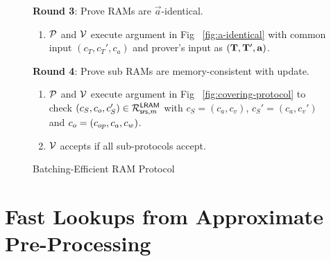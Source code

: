 \begin{figure}[t!]
\begin{mdframed}
        {\bf Round 3}: Prove RAMs are $\vec{a}$-identical.
        \begin{enumerate}[leftmargin=1em, label=\arabic*.]
            \item $\mathcal{P}$ and $\mathcal{V}$ execute argument in Fig ~\ref{fig:a-identical} with common input
            $(c_T,c_T',c_a)$ and prover's input as $(\mathbf{T},\mathbf{T}',\mathbf{a})$.
        \end{enumerate}

        {\bf Round 4}: Prove sub RAMs are memory-consistent with update.
        \begin{enumerate}[leftmargin=1em, label=\arabic*.]
        \item $\mathcal{P}$ and $\mathcal{V}$ execute argument in Fig ~\ref{fig:covering-protocol}
        to check $(c_S, c_o, c_S')\in \mathcal{R}^{\mathsf{LRAM}}_{\mathsf{srs},m}$ with $c_S = (c_a, c_v)$, $c_S'=(c_a, c_v')$ and
        $c_o=(c_{op},c_a,c_w)$.
        \item $\mathcal{V}$ accepts if all sub-protocols accept.
        \end{enumerate}
    \end{mdframed}
    \caption{Batching-Efficient RAM Protocol}
    \label{fig:complete-listing}
\end{figure}

\section{Fast Lookups from Approximate Pre-Processing}\label{sec:update-protocol}

